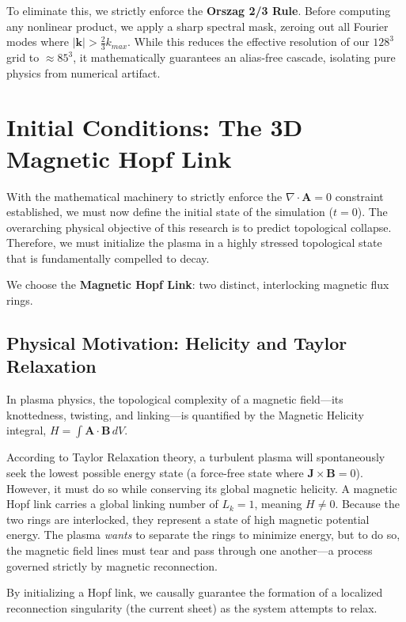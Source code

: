 \documentclass[11pt, a4paper]{article}
\begin{document}
To eliminate this, we strictly enforce the \textbf{Orszag 2/3 Rule}. Before computing any nonlinear product, we apply a sharp spectral mask, zeroing out all Fourier modes where $|\mathbf{k}| > \frac{2}{3}k_{max}$. While this reduces the effective resolution of our $128^3$ grid to $\approx 85^3$, it mathematically guarantees an alias-free cascade, isolating pure physics from numerical artifact.

\section{Initial Conditions: The 3D Magnetic Hopf Link}
\label{sec:hopf_link}

With the mathematical machinery to strictly enforce the $\nabla \cdot \mathbf{A} = 0$ constraint established, we must now define the initial state of the simulation ($t=0$). The overarching physical objective of this research is to predict topological collapse. Therefore, we must initialize the plasma in a highly stressed topological state that is fundamentally compelled to decay.

We choose the \textbf{Magnetic Hopf Link}: two distinct, interlocking magnetic flux rings.

\subsection{Physical Motivation: Helicity and Taylor Relaxation}
In plasma physics, the topological complexity of a magnetic field—its knottedness, twisting, and linking—is quantified by the Magnetic Helicity integral, $H = \int \mathbf{A} \cdot \mathbf{B} \, dV$. 

According to Taylor Relaxation theory, a turbulent plasma will spontaneously seek the lowest possible energy state (a force-free state where $\mathbf{J} \times \mathbf{B} = 0$). However, it must do so while conserving its global magnetic helicity. A magnetic Hopf link carries a global linking number of $L_k = 1$, meaning $H \neq 0$. Because the two rings are interlocked, they represent a state of high magnetic potential energy. The plasma \textit{wants} to separate the rings to minimize energy, but to do so, the magnetic field lines must tear and pass through one another—a process governed strictly by magnetic reconnection. 

By initializing a Hopf link, we causally guarantee the formation of a localized reconnection singularity (the current sheet) as the system attempts to relax.
\end{document}
